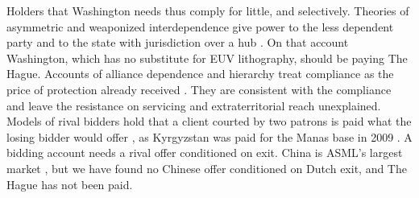 Holders that Washington needs thus comply for little, and selectively. Theories of asymmetric and weaponized interdependence give power to the less dependent party and to the state with jurisdiction over a hub \citep{hirschman1945national, keohane1977power, farrell2019weaponized}. On that account Washington, which has no substitute for EUV lithography, should be paying The Hague. Accounts of alliance dependence and hierarchy treat compliance as the price of protection already received \citep{morrow1991alliances, lake2009hierarchy}. They are consistent with the compliance and leave the resistance on servicing and extraterritorial reach unexplained. Models of rival bidders hold that a client courted by two patrons is paid what the losing bidder would offer \citep{groseclose1996buying, bueno2016competition}, as Kyrgyzstan was paid for the Manas base in 2009 \citep{cooley2012great}. A bidding account needs a rival offer conditioned on exit. China is ASML's largest market \citep{asml2026annual}, but we have found no Chinese offer conditioned on Dutch exit, and The Hague has not been paid.

